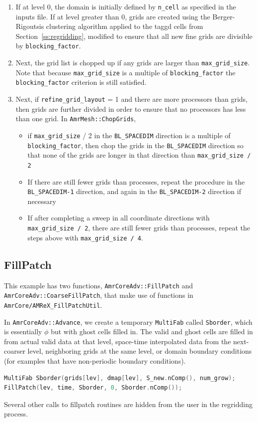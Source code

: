 \begin{enumerate}
\item If at level 0, the domain is initially defined by {\tt n\_cell} 
as specified in the inputs file.  If at level greater than 0, 
grids are created using the Berger-Rigoutsis clustering algorithm applied to the
taggd cells from Section~\ref{ss:regridding}, modified to ensure that 
all new fine grids are divisible by {\tt blocking\_factor}.

\item Next, the grid list is chopped up if any grids are larger than {\tt max\_grid\_size}.
Note that because {\tt max\_grid\_size} is a multiple of {\tt blocking\_factor}
the {\tt blocking\_factor} criterion is still satisfied.

\item Next, if {\tt refine\_grid\_layout} = 1 and there are more processors than grids,
then grids are further divided in order to ensure that no processors has less than one grid.  
In {\tt AmrMesh::ChopGrids}, 

\begin{itemize}
\item if {\tt max\_grid\_size} / 2 in the {\tt BL\_SPACEDIM} direction is a multiple of 
{\tt blocking\_factor}, then chop the grids in the {\tt BL\_SPACEDIM} direction
so that none of the grids are longer in that direction than {\tt max\_grid\_size / 2} 
\item If there are still fewer grids than processes, repeat the procedure in the 
{\tt BL\_SPACEDIM-1} direction, and again in the {\tt BL\_SPACEDIM-2} direction if necessary
\item If after completing a sweep in all coordinate directions with  {\tt max\_grid\_size / 2},
there are still fewer grids than processes, repeat the steps above with  {\tt max\_grid\_size / 4}.
\end{itemize}

\end{enumerate}

\subsection{FillPatch}
This example has two functions, {\tt AmrCoreAdv::FillPatch} and {\tt AmrCoreAdv::CoarseFillPatch},
that make use of functions in {\tt AmrCore/AMReX\_FillPatchUtil}.

In {\tt AmrCoreAdv::Advance}, we create a temporary {\tt MultiFab} called {\tt Sborder}, which
is essentially $\phi$ but with ghost cells filled in.  The valid and ghost cells are filled in from
actual valid data at that level, space-time interpolated data from the next-coarser level, 
neighboring grids at the same level, or domain boundary conditions 
(for examples that have non-periodic boundary conditions).
\begin{lstlisting}[language=cpp]
MultiFab Sborder(grids[lev], dmap[lev], S_new.nComp(), num_grow);
FillPatch(lev, time, Sborder, 0, Sborder.nComp());
\end{lstlisting}
Several other calls to fillpatch routines are hidden from the user in the regridding process.

